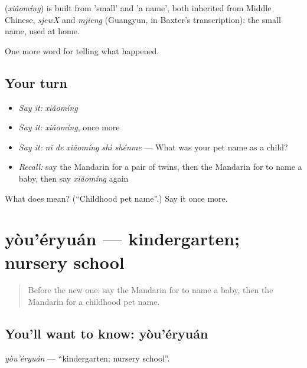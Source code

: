 \begin{cousinweb}
\textbf{} (\emph{xiǎomíng}) is built from  'small' and  'a name', both inherited from Middle Chinese, \emph{sjewX} and \emph{mjieng} (Guangyun, in Baxter's transcription): the small name, used at home.
\end{cousinweb}

\begin{grammarlens}[title={What you've built}]
One more word for telling what happened.
\end{grammarlens}

\subsection*{Your turn}
\begin{itemize}
\raggedright
  \item \emph{Say it:} \emph{xiǎomíng}
  \item \emph{Say it:} \emph{xiǎomíng}, once more
  \item \emph{Say it:} \emph{nǐ de xiǎomíng shì shénme} — What was your pet name as a child?
  \item \emph{Recall:} say the Mandarin for a pair of twins, then the Mandarin for to name a baby, then say \emph{xiǎomíng} again
\end{itemize}

\begin{tcolorbox}[breakable,colback=teal!4,colframe=teal!35!black,title={Before you move on}]
What does  mean? (\textquotedblleft{}Childhood pet name\textquotedblright{}.) Say it once more.
\end{tcolorbox}
\section[yòu'éryuán]{yòu'éryuán — kindergarten; nursery school}

\label{lesson:ZH-C303-youeryuan}



\begin{quote}
Before the new one: say the Mandarin for to name a baby, then the Mandarin for a childhood pet name.
\end{quote}

\subsection*{You'll want to know: yòu'éryuán}
\emph{yòu'éryuán} — \textquotedblleft{}kindergarten; nursery school\textquotedblright{}.

